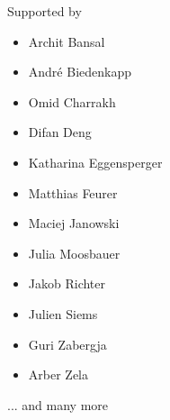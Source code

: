 \begin{frame}[c]{Supported by}


\begin{itemize}
	\item Archit Bansal
	\item Andr\'e Biedenkapp
    \item Omid Charrakh
	\item Difan Deng
	\item Katharina Eggensperger
	\item Matthias Feurer
	\item Maciej Janowski
    \item Julia Moosbauer
    \item Jakob Richter
	\item Julien Siems
	\item Guri Zabergja
	\item Arber Zela
\end{itemize}

%
%
%
%
%
%
%
%
%
\bigskip
... and many more


\end{frame}


